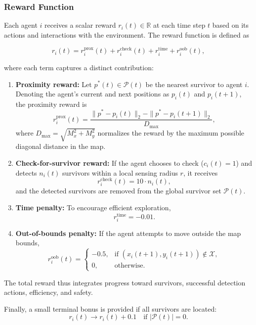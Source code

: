 \documentclass[conference]{IEEEtran}
\begin{document}
\subsubsection{Reward Function}
Each agent \(i\) receives a scalar reward \(r_i(t) \in \mathbb{R}\) at each time step \(t\) based on its actions and interactions with the environment. The reward function is defined as

\[
r_i(t) = r_i^{\text{prox}}(t) + r_i^{\text{check}}(t) + r_i^{\text{time}} + r_i^{\text{oob}}(t),
\]

where each term captures a distinct contribution:

\begin{enumerate}
    \item \textbf{Proximity reward:} Let \(p^\ast(t) \in \mathcal{P}(t)\) be the nearest survivor to agent \(i\). Denoting the agent's current and next positions as $p_i(t)$ and $p_i(t+1)$, the proximity reward is
    \[
   r_i^{\text{prox}}(t) = \frac{\|p^\ast - p_i(t)\|_2 - \|p^\ast - p_i(t+1)\|_2}{D_{\max}},
    \]
    where \(D_{\max} = \sqrt{M_x^2 + M_y^2}\) normalizes the reward by the maximum possible diagonal distance in the map.

    \item \textbf{Check-for-survivor reward:} If the agent chooses to check (\(c_i(t)=1\)) and detects \(n_i(t)\) survivors within a local sensing radius \(r\), it receives
    \[
    r_i^{\text{check}}(t) = 10 \cdot n_i(t),
    \]
    and the detected survivors are removed from the global survivor set \(\mathcal{P}(t)\).

    \item \textbf{Time penalty:} To encourage efficient exploration,
    \[
    r_i^{\text{time}} = -0.01.
    \]

    \item \textbf{Out-of-bounds penalty:} If the agent attempts to move outside the map bounds,
    \[
    r_i^{\text{oob}}(t) = 
    \begin{cases}
        -0.5, & \text{if } (x_i(t+1),y_i(t+1)) \notin \mathcal{X}, \\
        0, & \text{otherwise}.
    \end{cases}
    \]
\end{enumerate}

The total reward thus integrates progress toward survivors, successful detection actions, efficiency, and safety.

Finally, a small terminal bonus is provided if all survivors are located:
\[
r_i(t) \to r_i(t) + 0.1 \quad \text{if } |\mathcal{P}(t)| = 0.
\]
\end{document}
